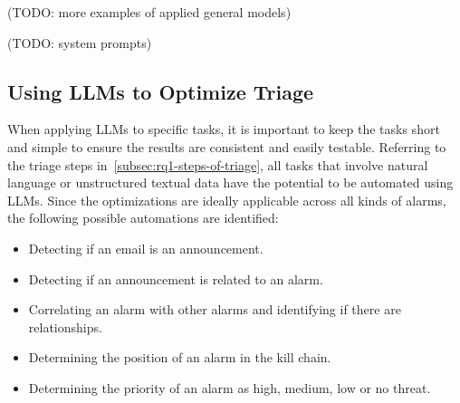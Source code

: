 (TODO: more examples of applied general models) %

(TODO: system prompts) %

\subsection{Using LLMs to Optimize Triage}
\label{subsec:rq1-llms-in-context}

When applying LLMs to specific tasks, it is important to keep the tasks short and simple to ensure the results are
consistent and easily testable.
Referring to the triage steps in\ \ref{subsec:rq1-steps-of-triage}, all tasks that involve natural language or
unstructured textual data have the potential to be automated using LLMs.
Since the optimizations are ideally applicable across all kinds of alarms, the following possible automations are
identified:
\begin{itemize}
    \item Detecting if an email is an announcement.
    \item Detecting if an announcement is related to an alarm.
    \item Correlating an alarm with other alarms and identifying if there are relationships.
    \item Determining the position of an alarm in the kill chain.
    \item Determining the priority of an alarm as high, medium, low or no threat.
\end{itemize}
